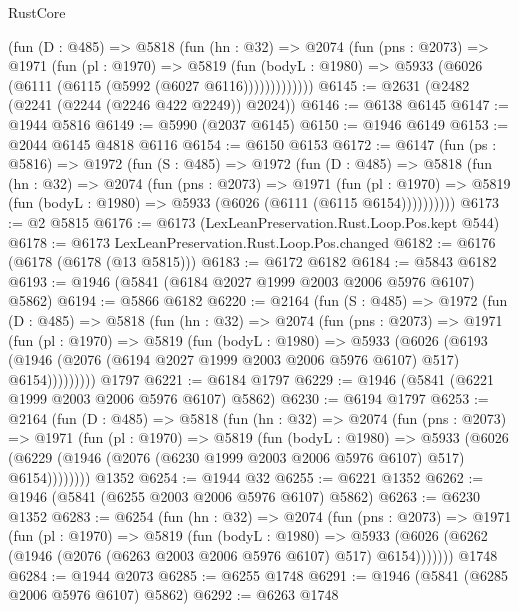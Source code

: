 \begin{lexlean}{RustCore}
\begin{coremodule}
          (fun (D : @485) =>
          @5818
            (fun (hn : @32) =>
            @2074
              (fun (pns : @2073) =>
              @1971
                (fun (pl : @1970) =>
                @5819
                  (fun (bodyL : @1980) =>
                  @5933 (@6026 (@6111 (@6115 (@5992 (@6027 @6116)))))))))))))
@6145 := @2631 (@2482 (@2241 (@2244 (@2246 @422 @2249)) @2024))
@6146 := @6138 @6145
@6147 := @1944 @5816
@6149 := @5990 (@2037 @6145)
@6150 := @1946 @6149
@6153 := @2044 @6145 @4818 @6116
@6154 := @6150 @6153
@6172 := @6147
    (fun (ps : @5816) =>
    @1972
      (fun (S : @485) =>
      @1972
        (fun (D : @485) =>
        @5818
          (fun (hn : @32) =>
          @2074
            (fun (pns : @2073) =>
            @1971
              (fun (pl : @1970) =>
              @5819 (fun (bodyL : @1980) => @5933 (@6026 (@6111 (@6115 @6154))))))))))
@6173 := @2 @5815
@6176 := @6173 (LexLeanPreservation.Rust.Loop.Pos.kept @544)
@6178 := @6173 LexLeanPreservation.Rust.Loop.Pos.changed
@6182 := @6176 (@6178 (@6178 (@13 @5815)))
@6183 := @6172 @6182
@6184 := @5843 @6182
@6193 := @1946 (@5841 (@6184 @2027 @1999 @2003 @2006 @5976 @6107) @5862)
@6194 := @5866 @6182
@6220 := @2164
    (fun (S : @485) =>
    @1972
      (fun (D : @485) =>
      @5818
        (fun (hn : @32) =>
        @2074
          (fun (pns : @2073) =>
          @1971
            (fun (pl : @1970) =>
            @5819
              (fun (bodyL : @1980) =>
              @5933
                (@6026
                  (@6193
                    (@1946 (@2076 (@6194 @2027 @1999 @2003 @2006 @5976 @6107) @517) @6154)))))))))
    @1797
@6221 := @6184 @1797
@6229 := @1946 (@5841 (@6221 @1999 @2003 @2006 @5976 @6107) @5862)
@6230 := @6194 @1797
@6253 := @2164
    (fun (D : @485) =>
    @5818
      (fun (hn : @32) =>
      @2074
        (fun (pns : @2073) =>
        @1971
          (fun (pl : @1970) =>
          @5819
            (fun (bodyL : @1980) =>
            @5933
              (@6026 (@6229 (@1946 (@2076 (@6230 @1999 @2003 @2006 @5976 @6107) @517) @6154))))))))
    @1352
@6254 := @1944 @32
@6255 := @6221 @1352
@6262 := @1946 (@5841 (@6255 @2003 @2006 @5976 @6107) @5862)
@6263 := @6230 @1352
@6283 := @6254
    (fun (hn : @32) =>
    @2074
      (fun (pns : @2073) =>
      @1971
        (fun (pl : @1970) =>
        @5819
          (fun (bodyL : @1980) =>
          @5933 (@6026 (@6262 (@1946 (@2076 (@6263 @2003 @2006 @5976 @6107) @517) @6154)))))))
    @1748
@6284 := @1944 @2073
@6285 := @6255 @1748
@6291 := @1946 (@5841 (@6285 @2006 @5976 @6107) @5862)
@6292 := @6263 @1748

\end{coremodule}
\end{lexlean}
